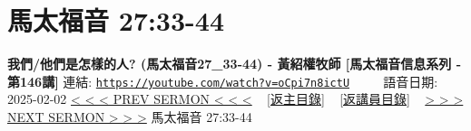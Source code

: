 \documentclass{book}
\begin{document}
\section{馬太福音 27:33-44}
\label{sec:oCpi7n8ictU}
\textbf{我們/他們是怎樣的人? (馬太福音27\_33-44) - 黃紹權牧師  [馬太福音信息系列 - 第146講]}
\newline
\newline
連結: \href{https://youtube.com/watch?v=oCpi7n8ictU}{\texttt{https://youtube.com/watch?v=oCpi7n8ictU}} ~~~~ 語音日期: 2025-02-02
\newline
\newline
\hyperref[sec:HaaLhKYBRSg]{< < < PREV SERMON < < <}
~
\hyperlink{toc}{[返主目錄]}
~
\hyperref[ch:preacher16]{[返講員目錄]}
~
\hyperref[sec:7upP8JmD6zY]{> > > NEXT SERMON > > >}
\newline
\newline
馬太福音 27:33-44
\newline
\end{document}
